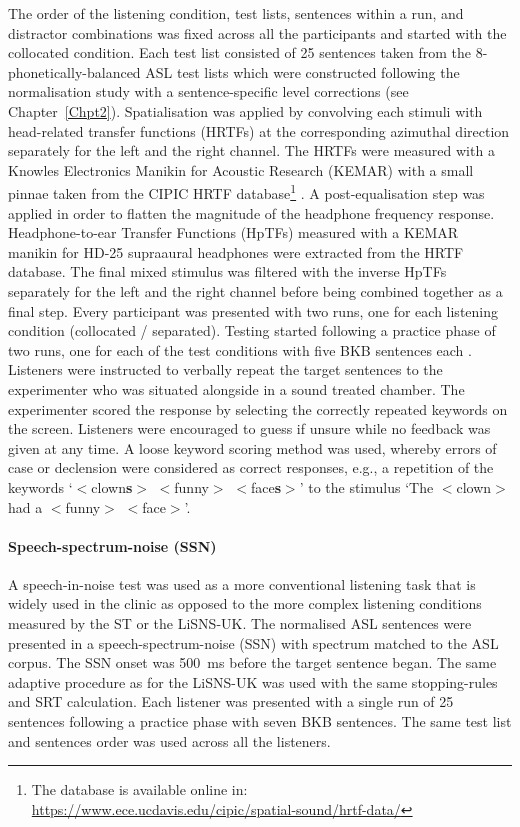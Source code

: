 \documentclass[a4paper, twoside]{templates/ociamthesis}
\begin{document}
The order of the listening condition, test lists, sentences within a run, and distractor combinations was fixed across all the participants and started with the collocated condition. Each test list consisted of 25 sentences taken from the 8-phonetically-balanced ASL test lists which were constructed following the normalisation study with a sentence-specific level corrections (see Chapter~\ref{Chpt2}). Spatialisation was applied by convolving each stimuli with head-related transfer functions (HRTFs) at the corresponding azimuthal direction separately for the left and the right channel. The HRTFs were measured with a Knowles Electronics Manikin for Acoustic Research (KEMAR) with a small pinnae taken from the CIPIC HRTF database\footnote{The database is available online in: \url{https://www.ece.ucdavis.edu/cipic/spatial-sound/hrtf-data/}} \autocite[see][``special'' HRTF data]{Algazi2001}. A post-equalisation step was applied in order to flatten the magnitude of the headphone frequency response. Headphone-to-ear Transfer Functions (HpTFs) measured with a KEMAR manikin for HD-25 supraaural headphones were extracted from the \textcite{Wierstorf2011} HRTF database. The final mixed stimulus was filtered with the inverse HpTFs separately for the left and the right channel before being combined together as a final step. Every participant was presented with two runs, one for each listening condition (collocated / separated). Testing started following a practice phase of two runs, one for each of the test conditions with five BKB sentences each \autocite{Bench1979}. Listeners were instructed to verbally repeat the target sentences to the experimenter who was situated alongside in a sound treated chamber. The experimenter scored the response by selecting the correctly repeated keywords on the screen. Listeners were encouraged to guess if unsure while no feedback was given at any time. A loose keyword scoring method was used, whereby errors of case or declension were considered as correct responses, e.g., a repetition of the keywords `\(<\)clown\textbf{s}\(>\) \(<\)funny\(>\) \(<\)face\textbf{s}\(>\)' to the stimulus `The \(<\)clown\(>\) had a \(<\)funny\(>\) \(<\)face\(>\)'.

\hypertarget{speech-spectrum-noise-ssn}{%
\paragraph{Speech-spectrum-noise (SSN)}\label{speech-spectrum-noise-ssn}}

\hfill\break
A speech-in-noise test was used as a more conventional listening task that is widely used in the clinic as opposed to the more complex listening conditions measured by the ST or the LiSNS-UK. The normalised ASL sentences were presented in a speech-spectrum-noise (SSN) with spectrum matched to the ASL corpus. The SSN onset was 500~ms before the target sentence began. The same adaptive procedure as for the LiSNS-UK was used with the same stopping-rules and SRT calculation. Each listener was presented with a single run of 25 sentences following a practice phase with seven BKB sentences. The same test list and sentences order was used across all the listeners.
\end{document}

